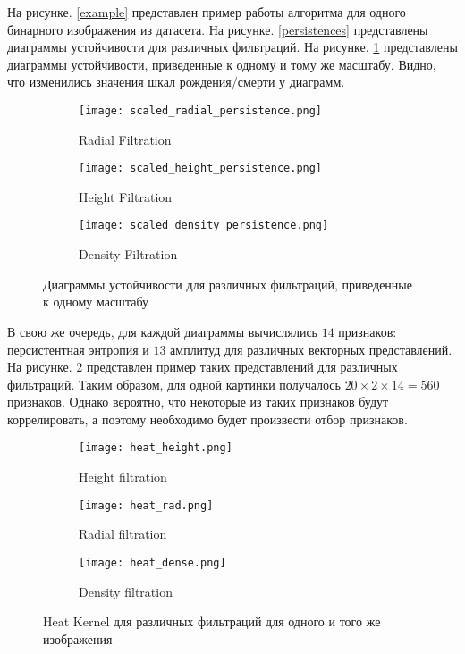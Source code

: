  На рисунке. \ref{example} представлен пример работы алгоритма для одного бинарного изображения из датасета. На рисунке. \ref{persistences} представлены диаграммы устойчивости для различных фильтраций. На рисунке. \ref{scaled_persistences} представлены диаграммы устойчивости, приведенные к одному и тому же масштабу. Видно, что изменились значения шкал рождения/смерти у диаграмм.


\begin{figure}[!htbp]
	\begin{subfigure}{.33\textwidth}
		\centering
		\texttt{[image: scaled\_radial\_persistence.png]}\\
		\caption{Radial Filtration}
	\end{subfigure}%
	\begin{subfigure}{.33\textwidth}
		\centering
		\texttt{[image: scaled\_height\_persistence.png]}\\
		\caption{Height Filtration}
	\end{subfigure}%
	\begin{subfigure}{.33\textwidth}
		\centering
		\texttt{[image: scaled\_density\_persistence.png]}\\
		\caption{Density Filtration}
	\end{subfigure}%
	\caption{Диаграммы устойчивости для различных фильтраций, приведенные к одному масштабу}
	\label{scaled_persistences}
\end{figure}

В свою же очередь, для каждой диаграммы вычислялись $14$ признаков: персистентная энтропия и $13$ амплитуд для различных векторных представлений. На рисунке. \ref{representations} представлен пример таких представлений для различных фильтраций. Таким образом, для одной картинки получалось $20 \times 2 \times 14 = 560$ признаков. Однако вероятно, что некоторые из таких признаков будут коррелировать, а поэтому необходимо будет произвести отбор признаков.

\begin{figure}[!htbp]
	\begin{subfigure}{.33\textwidth}
		\centering
		\texttt{[image: heat\_height.png]}\\
		\caption{Height filtration}
	\end{subfigure}%
	\begin{subfigure}{.33\textwidth}
		\centering
		\texttt{[image: heat\_rad.png]}\\
		\caption{Radial filtration}
	\end{subfigure}%
	\begin{subfigure}{.33\textwidth}
		\centering
		\texttt{[image: heat\_dense.png]}\\
		\caption{Density filtration}
	\end{subfigure}%
	\caption{Heat Kernel для различных фильтраций для одного и того же изображения}
	\label{representations}
\end{figure}

